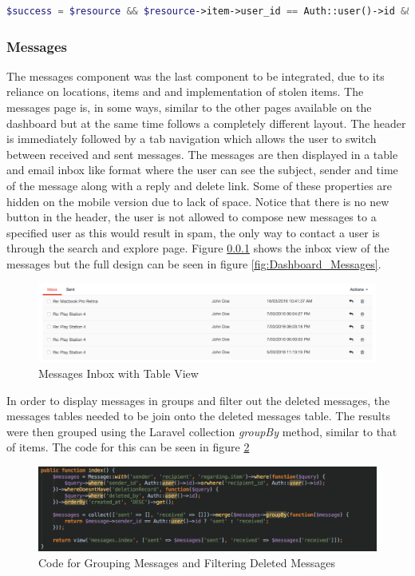 \begin{lstlisting}[language=php]
	$success = $resource && $resource->item->user_id == Auth::user()->id && ($resource->type != Resource::$PUBLIC || $publicResources->count() > 1) && $resource->delete();
\end{lstlisting}

\subsubsection{Messages}
The messages component was the last component to be integrated, due to its reliance on locations, items and and implementation of stolen items. The messages page is, in some ways, similar to the other pages available on the dashboard but at the same time follows a completely different layout. The header is immediately followed by a tab navigation which allows the user to switch between received and sent messages. The messages are then displayed in a table and email inbox like format where the user can see the subject, sender and time of the message along with a reply and delete link. Some of these properties are hidden on the mobile version due to lack of space. Notice that there is no new button in the header, the user is not allowed to compose new messages to a specified user as this would result in spam, the only way to contact a user is through the search and explore page. Figure \ref{} shows the inbox view of the messages but the full design can be seen in figure \ref{fig:Dashboard_Messages}.

\begin{figure}[H]
	\centering
	\includegraphics[width=1.0\textwidth]{images/Frisk/Inbox}
	\caption{Messages Inbox with Table View} \label{fig:Inbox}
\end{figure}

In order to display messages in groups and filter out the deleted messages, the messages tables needed to be join onto the deleted messages table. The results were then grouped using the Laravel collection \emph{groupBy} method, similar to that of items. The code for this can be seen in figure \ref{fig:Messages_Code}

\begin{figure}[H]
	\centering
	\includegraphics[width=1.0\textwidth]{images/Code/Messages}
	\caption{Code for Grouping Messages and Filtering Deleted Messages} \label{fig:Messages_Code}
\end{figure}

